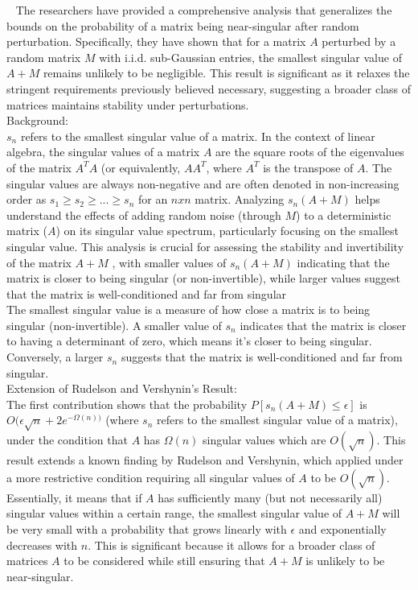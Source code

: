 
~\cite{jain2020smoothed}
The researchers have provided a comprehensive analysis that generalizes the bounds on the probability of a matrix being near-singular after random perturbation. Specifically, they have shown that for a matrix ${A}$ perturbed by a random matrix 
${M}$ with i.i.d. sub-Gaussian entries, the smallest singular value of ${A+M}$ remains unlikely to be negligible. This result is significant as it relaxes the stringent requirements previously believed necessary, suggesting a broader class of matrices maintains stability under perturbations.\\\newline
Background:\\
${s_n}$ refers to the smallest singular value of a matrix. In the context of linear algebra, the singular values of a matrix ${A}$ are the square roots of the eigenvalues of the matrix ${A^T A}$ (or equivalently, ${A A^T}$, where ${A^T}$ is the transpose of ${A}$. The singular values are always non-negative and are often denoted in non-increasing order as ${s_1 \geq s_2 \geq ... \geq s_n}$
for an ${n x n}$ matrix. Analyzing ${s_n(A+M)}$ helps understand the effects of adding random noise (through ${M}$) to a deterministic matrix (${A}$) on its singular value spectrum, particularly focusing on the smallest singular value. This analysis is crucial for assessing the stability and invertibility of the matrix ${A+M}$ , with smaller values of ${s_n(A+M)}$ indicating that the matrix is closer to being singular (or non-invertible), while larger values suggest that the matrix is well-conditioned and far from singular\\
The smallest singular value is a measure of how close a matrix is to being singular (non-invertible). A smaller value of ${s_n}$ indicates that the matrix is closer to having a determinant of zero, which means it's closer to being singular. Conversely, a larger ${s_n}$ suggests that the matrix is well-conditioned and far from singular.\\\newline
Extension of Rudelson and Vershynin's Result:\\
The first contribution shows that the probability ${P[s_n(A+M) \leq \epsilon]}$ is ${O(\epsilon \sqrt{n} + 2e^{- \Omega (n))}}$ (where ${s_n}$ refers to the smallest singular value of a matrix), under the condition that ${A}$ has ${\Omega (n)}$ singular values which are ${O(\sqrt{n})}$. This result extends a known finding by Rudelson and Vershynin, which applied under a more restrictive condition requiring all singular values of ${A}$ to be ${O(\sqrt{n})}$. Essentially, it means that if ${A}$ has sufficiently many (but not necessarily all) singular values within a certain range, the smallest singular value of ${A+M}$ will be very small with a probability that grows linearly with ${\epsilon}$ and exponentially decreases with ${n}$. This is significant because it allows for a broader class of matrices ${A}$ to be considered while still ensuring that ${A+M}$ is unlikely to be near-singular.\\\newline
